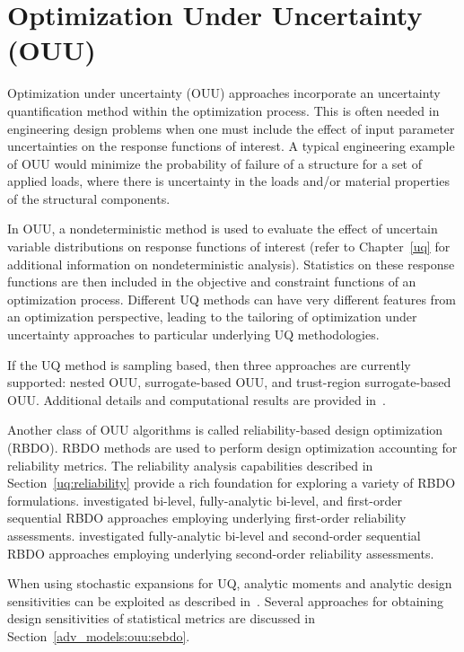 \section{Optimization Under Uncertainty (OUU)} \label{adv_models:ouu}

Optimization under uncertainty (OUU) approaches incorporate an
uncertainty quantification method within the optimization
process. This is often needed in engineering design problems when one
must include the effect of input parameter uncertainties on the
response functions of interest. A typical engineering example of OUU
would minimize the probability of failure of a structure for a set of
applied loads, where there is uncertainty in the loads and/or material
properties of the structural components.

In OUU, a nondeterministic method is used to evaluate the effect of
uncertain variable distributions on response functions of interest
(refer to Chapter~\ref{uq} for additional information on
nondeterministic analysis). Statistics on these response functions are
then included in the objective and constraint functions of an
optimization process.  Different UQ methods can have very different
features from an optimization perspective, leading to the tailoring of
optimization under uncertainty approaches to particular underlying UQ
methodologies.

If the UQ method is sampling based, then three approaches are
currently supported: nested OUU, surrogate-based OUU, and trust-region
surrogate-based OUU.  Additional details and computational results are
provided in~\cite{Eld02}.

Another class of OUU algorithms is called reliability-based design
optimization (RBDO).  RBDO methods are used to perform design
optimization accounting for reliability metrics.  The reliability
analysis capabilities described in Section~\ref{uq:reliability}
provide a rich foundation for exploring a variety of RBDO
formulations.  \cite{Eld05} investigated bi-level, fully-analytic
bi-level, and first-order sequential RBDO approaches employing
underlying first-order reliability assessments.
\cite{Eld06a} investigated fully-analytic bi-level and 
second-order sequential RBDO approaches employing underlying
second-order reliability assessments.  

When using stochastic expansions for UQ, analytic moments and
analytic design sensitivities can be exploited as described
in~\cite{Eld07}.  Several approaches for obtaining design
sensitivities of statistical metrics are discussed in 
Section~\ref{adv_models:ouu:sebdo}.

